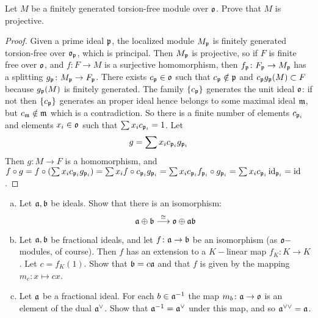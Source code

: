  \begin{ex}
    Let $M$ be a finitely generated torsion-free module over $\oo$. Prove that $M$ is projective.
  \end{ex}
  \begin{proof}
    Given a prime ideal $\pp$, the localized module $M_{\pp}$ is finitely generated torsion-free over $\oo_{\pp}$, which is principal. Then $M_{\pp}$ is projective, so if $F$ is finite free over $\oo$, and $f\colon F\to M$ is a surjective homomorphism, then $f_{\pp}\colon F_{\pp}\to M_{\pp}$ has a splitting $g_{\pp}\colon M_{\pp}\to F_{\pp}$. There exists $c_{\pp}\in\oo$ such that $c_{\pp}\notin\pp$ and $c_{\pp}g_{\pp}(M)\subset F$ because $g_{\pp}(M)$ is finitely generated. The family $\{c_{\pp}\}$ generates the unit ideal $\oo$: if not then $\{c_{\pp}\}$ generates an proper ideal hence belongs to some maximal ideal $\mm$, but $c_{\mm}\notin\mm$ which is a contradiction. So there is a finite number of elements $c_{\pp_i}$ and elements $x_i\in\oo$ such that $\sum x_ic_{\pp_i}=1$. Let
    \begin{equation*}
      g=\sum x_ic_{\pp_i}g_{\pp_i}
    \end{equation*}
    Then $g\colon M\to F$ is a homomorphism, and $f\circ g=f\circ(\sum x_ic_{\pp_i}g_{\pp_i})=\sum x_i f\circ c_{\pp_i} g_{\pp_i}=\sum x_ic_{\pp_i} f_{\pp_i}\circ g_{\pp_i}=\sum x_ic_{\pp_i}\id_{\pp_i}=\id$.
  \end{proof}
  \begin{ex}\label{3.ex12}
    \begin{enumerate}[a)]
      \item Let $\aa,\bb$ be ideals. Show that there is an isomorphism:
               \begin{equation*}
                 \aa\oplus\bb\markar{\cong}\oo\oplus\aa\bb
               \end{equation*}
      \item Let $\aa,\bb$ be fractional ideals, and let $f\colon\aa\to\bb$ be an isomorphism (as $\oo-$modules, of course).
               Then $f$ has an extension to a $K-$linear map $f_K\colon K\to K$. Let $c=f_K(1)$. Show that $\bb=c\aa$ and that $f$ is given by the mapping $m_c\colon x\mapsto cx$.
      \item Let $\aa$ be a fractional ideal. For each $b\in\aa^{-1}$ the map $m_b\colon\aa\to\oo$ is an element of the dual $\codual{\aa}$.
               Show that $\aa^{-1}=\codual{\aa}$ under this map, and so $\aa^{\vee\vee}=\aa$.
    \end{enumerate}
  \end{ex}
